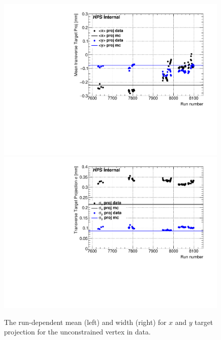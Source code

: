
\begin{figure}[t!]
    \centering
        \includegraphics[width=.85\textwidth]{figs/recon/xy_proj_final.pdf}
        \includegraphics[width=.85\textwidth]{figs/recon/sigma_xy_proj_final.pdf}
    \caption{The run-dependent mean (left) and width (right) for $x$ and $y$ target projection for the unconstrained vertex in data.}
    \label{fig:rundepposxys}
\end{figure}

